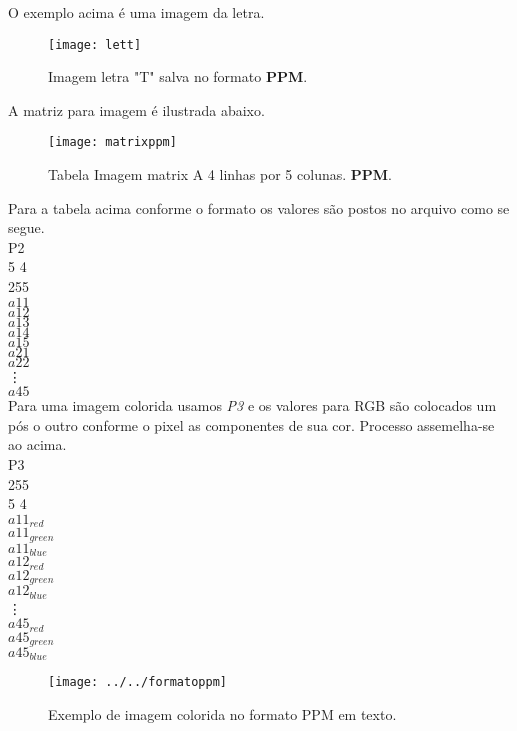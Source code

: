 \documentclass[12pt,a4paper]{article}
\begin{document}
	\noindent
	O exemplo acima é uma imagem da letra.
	
	\begin{figure}[h]
		\centering
		\texttt{[image: lett]}
		\caption{Imagem letra "T" salva no formato \textbf{PPM}.}
		\label{fig:lett}
	\end{figure}
	
	
	A matriz para imagem é ilustrada abaixo.
	\begin{figure}[h]
		\centering
		\texttt{[image: matrixppm]}
		\caption{Tabela Imagem matrix A 4 linhas por 5 colunas. \textbf{PPM}.}
		\label{fig:lett}
	\end{figure}
	

	Para a tabela acima conforme o formato os valores são postos no arquivo como se segue. \\

	\noindent	
	P2\\
	5 4\\
	255\\
	$a11$\\
	$a12$\\
	$a13$\\
	$a14$\\
	$a15$\\
	$a21$\\
	$a22$\\
	\vdots\\
	$a45$\\

	
	Para uma imagem colorida usamos \textit{P3} e os valores para RGB são colocados um pós o outro conforme o pixel as componentes de sua cor. Processo assemelha-se ao acima.\\
	
	\noindent
	P3 \\
	255 \\
	5 4 \\
	$a11_{red}$\\
	$a11_{green}$\\
	$a11_{blue}$\\
	$a12_{red}$\\
	$a12_{green}$\\
	$a12_{blue}$\\
	\vdots\\
	$a45_{red}$\\
	$a45_{green}$\\
	$a45_{blue}$\\
	
	\begin{figure}[h]
		\centering
		\texttt{[image: ../../formatoppm]}
		\caption{Exemplo de imagem colorida no formato PPM em texto.}
		\label{fig:formatoppm}
	\end{figure}
	
\end{document}
